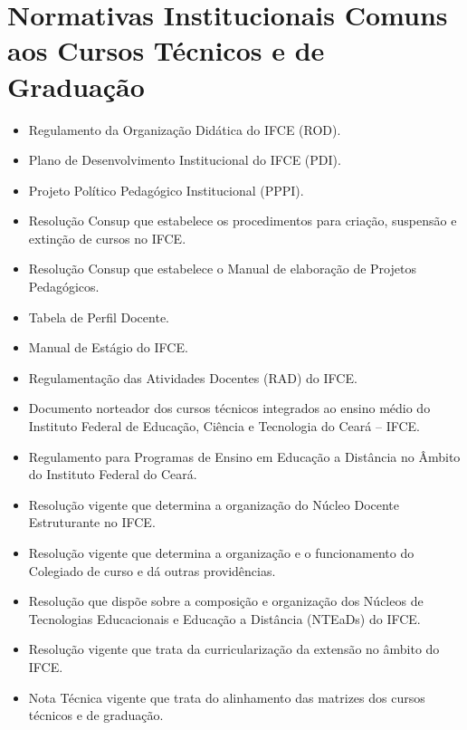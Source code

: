 \documentclass[
	12pt,				%
	openright,			%
	twoside,			%
	a4paper,			%
	chapter=TITLE,		%
	english,			%
	french,				%
	spanish,			%
	brazil,				%
	]{abntex2}
\begin{document}
\section{Normativas Institucionais Comuns aos Cursos Técnicos e de Graduação}

\begin{itemize}
    
   \item Regulamento da Organização Didática do IFCE (ROD).

   \item Plano de Desenvolvimento Institucional do IFCE (PDI).

   \item Projeto Político Pedagógico Institucional (PPPI).

   \item Resolução Consup que estabelece os procedimentos para criação, suspensão e extinção de cursos no IFCE.

   \item Resolução Consup que estabelece o Manual de elaboração de Projetos Pedagógicos.

   \item Tabela de Perfil Docente.

   \item Manual de Estágio do IFCE.

   \item Regulamentação das Atividades Docentes (RAD) do IFCE.

   \item Documento norteador dos cursos técnicos integrados ao ensino médio do Instituto Federal de Educação, Ciência e Tecnologia do Ceará – IFCE.

   \item Regulamento para Programas de Ensino em Educação a Distância no Âmbito do Instituto Federal do Ceará.

   \item Resolução vigente que determina a organização do Núcleo Docente Estruturante no IFCE.

   \item Resolução vigente que determina a organização e o funcionamento do Colegiado de curso e dá outras providências.

   \item Resolução que dispõe sobre a composição e organização dos Núcleos de Tecnologias Educacionais e Educação a Distância (NTEaDs) do IFCE.

   \item Resolução vigente que trata da curricularização da extensão no âmbito do IFCE.

   \item Nota Técnica vigente que trata do alinhamento das matrizes dos cursos técnicos e de graduação.
\end{itemize}
\end{document}
